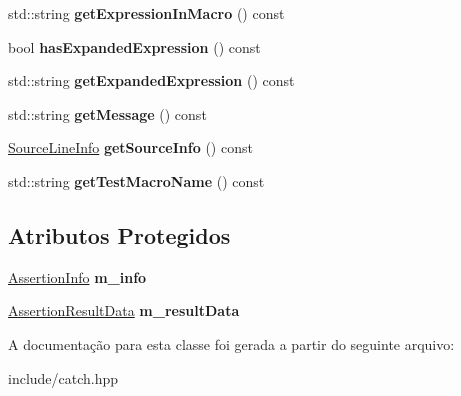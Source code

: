 \begin{DoxyCompactItemize}
\item 
std\+::string {\bfseries get\+Expression\+In\+Macro} () const \hypertarget{classCatch_1_1AssertionResult_ac368a7490af7669decd58efea7d7dc54}{}\label{classCatch_1_1AssertionResult_ac368a7490af7669decd58efea7d7dc54}

\item 
bool {\bfseries has\+Expanded\+Expression} () const \hypertarget{classCatch_1_1AssertionResult_a122c369bd49430a304e3eaebdf184f36}{}\label{classCatch_1_1AssertionResult_a122c369bd49430a304e3eaebdf184f36}

\item 
std\+::string {\bfseries get\+Expanded\+Expression} () const \hypertarget{classCatch_1_1AssertionResult_a675d074588875eb62b0b6e36e05d65e6}{}\label{classCatch_1_1AssertionResult_a675d074588875eb62b0b6e36e05d65e6}

\item 
std\+::string {\bfseries get\+Message} () const \hypertarget{classCatch_1_1AssertionResult_a9793bfc4d24678c8a013bda84a5aa905}{}\label{classCatch_1_1AssertionResult_a9793bfc4d24678c8a013bda84a5aa905}

\item 
\hyperlink{structCatch_1_1SourceLineInfo}{Source\+Line\+Info} {\bfseries get\+Source\+Info} () const \hypertarget{classCatch_1_1AssertionResult_a68b73fe982a97fe6432af679af1a2dad}{}\label{classCatch_1_1AssertionResult_a68b73fe982a97fe6432af679af1a2dad}

\item 
std\+::string {\bfseries get\+Test\+Macro\+Name} () const \hypertarget{classCatch_1_1AssertionResult_a2901d41b199258ff6a44571b147169dd}{}\label{classCatch_1_1AssertionResult_a2901d41b199258ff6a44571b147169dd}

\end{DoxyCompactItemize}
\subsection*{Atributos Protegidos}
\begin{DoxyCompactItemize}
\item 
\hyperlink{structCatch_1_1AssertionInfo}{Assertion\+Info} {\bfseries m\+\_\+info}\hypertarget{classCatch_1_1AssertionResult_a3e7236f73a51d6fc8bb9dfdefcee7772}{}\label{classCatch_1_1AssertionResult_a3e7236f73a51d6fc8bb9dfdefcee7772}

\item 
\hyperlink{structCatch_1_1AssertionResultData}{Assertion\+Result\+Data} {\bfseries m\+\_\+result\+Data}\hypertarget{classCatch_1_1AssertionResult_add3455b8bbedb0d643e18da67c66b4f7}{}\label{classCatch_1_1AssertionResult_add3455b8bbedb0d643e18da67c66b4f7}

\end{DoxyCompactItemize}


A documentação para esta classe foi gerada a partir do seguinte arquivo\+:\begin{DoxyCompactItemize}
\item 
include/catch.\+hpp\end{DoxyCompactItemize}

